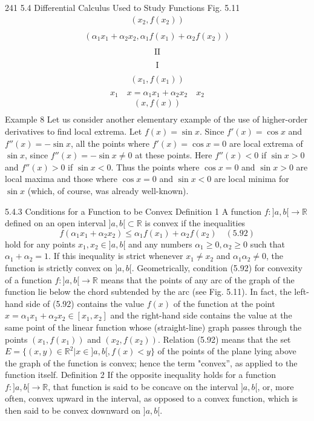241
5.4 Differential Calculus Used to Study Functions
Fig. 5.11
$$ \begin{array}{c} (x_2, f(x_2)) \\ \end{array} $$
$$ \begin{array}{c} (\alpha_1x_1 + \alpha_2x_2, \alpha_1 f(x_1) + \alpha_2 f (x_2)) \\ \end{array} $$
$$ \begin{array}{c} \text{II} \\ \end{array} $$
$$ \begin{array}{c} \text{I} \\ \end{array} $$
$$ \begin{array}{c} (x_1, f(x_1)) \\ \end{array} $$
$$ x_1 \quad x = \alpha_1x_1 + \alpha_2x_2 \quad x_2 $$
$$ \begin{array}{c} (x, f(x)) \\ \end{array} $$
Example 8 Let us consider another elementary example of the use of higher-order
derivatives to find local extrema. Let $f (x) = \sin x$. Since $f'(x) = \cos x$ and $f''(x) =
-\sin x$, all the points where $f'(x) = \cos x = 0$ are local extrema of $\sin x$, since
$f''(x) = - \sin x \ne 0$ at these points. Here $f''(x) < 0$ if $\sin x > 0$ and $f''(x) > 0$
if $\sin x < 0$. Thus the points where $\cos x = 0$ and $\sin x > 0$ are local maxima and
those where $\cos x = 0$ and $\sin x < 0$ are local minima for $\sin x$ (which, of course,
was already well-known).

5.4.3 Conditions for a Function to be Convex
Definition 1 A function $f : ]a, b[ \to \mathbb{R}$ defined on an open interval $]a, b[ \subset \mathbb{R}$ is
convex if the inequalities
$$ f (\alpha_1x_1 + \alpha_2x_2) \le \alpha_1 f (x_1) + \alpha_2 f (x_2) \quad (5.92) $$
hold for any points $x_1, x_2 \in ]a, b[$ and any numbers $\alpha_1 \ge 0, \alpha_2 \ge 0$ such that $\alpha_1 +
\alpha_2 = 1$. If this inequality is strict whenever $x_1 \ne x_2$ and $\alpha_1\alpha_2 \ne 0$, the function is
strictly convex on $]a, b[$.
Geometrically, condition (5.92) for convexity of a function $f : ]a, b[ \to \mathbb{R}$ means
that the points of any arc of the graph of the function lie below the chord subtended
by the arc (see Fig. 5.11).
In fact, the left-hand side of (5.92) contains the value $f(x)$ of the function at
the point $x = \alpha_1x_1 + \alpha_2x_2 \in [x_1, x_2]$ and the right-hand side contains the value at
the same point of the linear function whose (straight-line) graph passes through the
points $(x_1, f(x_1))$ and $(x_2, f (x_2))$.
Relation (5.92) means that the set $E = \{(x, y) \in \mathbb{R}^2 | x \in ]a, b[, f (x) < y\}$ of the
points of the plane lying above the graph of the function is convex; hence the term
"convex”, as applied to the function itself.
Definition 2 If the opposite inequality holds for a function $f : ]a, b[ \to \mathbb{R}$, that
function is said to be concave on the interval $]a, b[$, or, more often, convex upward
in the interval, as opposed to a convex function, which is then said to be convex
downward on $]a, b[$.